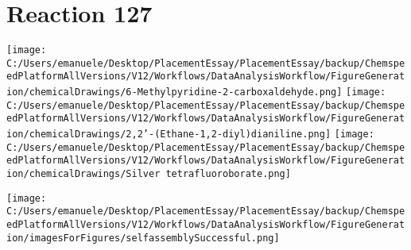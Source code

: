 \documentclass{article}%
\begin{document}
\section*{Reaction 127}%
%
\begin{scheme}[H]%
\begin{minipage}{0.5\textwidth}%
\texttt{[image: C:/Users/emanuele/Desktop/PlacementEssay/PlacementEssay/backup/ChemspeedPlatformAllVersions/V12/Workflows/DataAnalysisWorkflow/FigureGeneration/chemicalDrawings/6-Methylpyridine-2-carboxaldehyde.png]}%
\texttt{[image: C:/Users/emanuele/Desktop/PlacementEssay/PlacementEssay/backup/ChemspeedPlatformAllVersions/V12/Workflows/DataAnalysisWorkflow/FigureGeneration/chemicalDrawings/2,2'-(Ethane-1,2-diyl)dianiline.png]}%
\texttt{[image: C:/Users/emanuele/Desktop/PlacementEssay/PlacementEssay/backup/ChemspeedPlatformAllVersions/V12/Workflows/DataAnalysisWorkflow/FigureGeneration/chemicalDrawings/Silver tetrafluoroborate.png]}%
\end{minipage}%
\begin{minipage}{0.5\textwidth}%
\begin{center}%
\texttt{[image: C:/Users/emanuele/Desktop/PlacementEssay/PlacementEssay/backup/ChemspeedPlatformAllVersions/V12/Workflows/DataAnalysisWorkflow/FigureGeneration/imagesForFigures/selfassemblySuccessful.png]}%
\end{center}%
\end{minipage}%
\caption{Self-assembly of components 8, 20, with Silver(I) in a 3.0:1.5:1.0 molar ratio in CH$_3$CN at 60\textdegree C for 40h. These are the reagents (starting materials) for reaction 127.}%
\end{scheme}%
\end{document}
